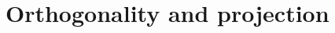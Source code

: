 \documentclass[11pt,twoside]{report}
\newcommand{\vecnot}{\underline}
\newcommand{\inner}[2]{{\left\langle #1 \mskip2mu , #2 \right\rangle}}
\begin{document}
%
%





\section{Orthogonality and projection} 
\end{document}
